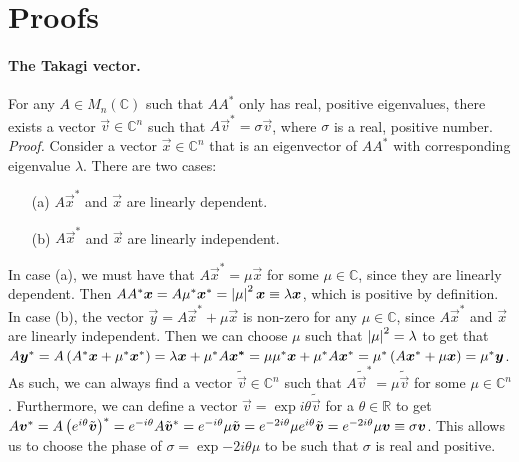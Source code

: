 \documentclass[english, notitlepage]{article}
\begin{document}
\section{Proofs}
    \paragraph{The Takagi vector.}
    For any \(A \in M_{n}(\mathbb{C})\) such that \(AA^\ast\) only has real, positive eigenvalues, there exists a vector \(\vec{v} \in \mathbb{C}^n\) such that \(A \vec{v}^* = \sigma \vec{v}\), where \(\sigma\) is a real, positive number.\\
    \emph{Proof.} Consider a vector \(\vec{x} \in \mathbb{C}^n\) that is an eigenvector of \(AA^\ast\) with corresponding eigenvalue \(\lambda\).
    There are two cases:
    \begin{itemize}
        \item[(a)] \(A\vec{x}^*\) and \(\vec{x}\) are linearly dependent.
        \item[(b)] \(A\vec{x}^*\) and \(\vec{x}\) are linearly independent.
    \end{itemize}
    In case (a), we must have that \(A\vec{x}^* = \mu \vec{x}\) for some \(\mu \in \mathbb{C}\), since they are linearly dependent.
    Then \(AA^\ast \boldsymbol{x} = A \mu^\ast \boldsymbol{x}^* = \left|\mu\right|^2 \boldsymbol{x} \equiv \lambda \boldsymbol{x}\), which is positive by definition.\\
    In case (b), the vector \(\vec{y} = A\vec{x}^* + \mu \vec{x}\) is non-zero for any \(\mu \in \mathbb{C}\), since \(A\vec{x}^*\) and \(\vec{x}\) are linearly independent.
    Then we can choose \(\mu\) such that \(\left|\mu\right|^2 = \lambda\) to get that \(A \boldsymbol{y}^* = A\left(A^\ast \boldsymbol{x} + \mu^\ast \boldsymbol{x}^*\right) = \lambda\boldsymbol{x} + \mu^\ast A\boldsymbol{x^*} = \mu\mu^\ast \boldsymbol{x} + \mu^\ast A\boldsymbol{x}^* = \mu^\ast \left(A \boldsymbol{x}^* + \mu \boldsymbol{x}\right) = \mu^\ast \boldsymbol{y}\).\\
    As such, we can always find a vector \(\tilde{\vec{v}} \in \mathbb{C}^n\) such that \(A \tilde{\vec{v}}^* = \mu \tilde{\vec{v}}\) for some \(\mu \in \mathbb{C}^n\).
    Furthermore, we can define a vector \(\vec{v} = \exp{i\theta} \tilde{\vec{v}}\) for a \(\theta \in \mathbb{R}\) to get \(A\boldsymbol{v}^* = A \left(e^{i\theta} \tilde{\boldsymbol{v}}\right)^\ast = e^{-i\theta} A\tilde{\boldsymbol{v}}^* = e^{-i\theta} \mu \tilde{\boldsymbol{v}} = e^{-2i\theta} \mu e^{i\theta} \tilde{\boldsymbol{v}} = e^{-2i\theta} \mu \boldsymbol{v} \equiv \sigma \boldsymbol{v}\).
    This allows us to choose the phase of \(\sigma = \exp{-2i\theta} \mu\) to be such that \(\sigma\) is real and positive.
    \medskip
\end{document}
